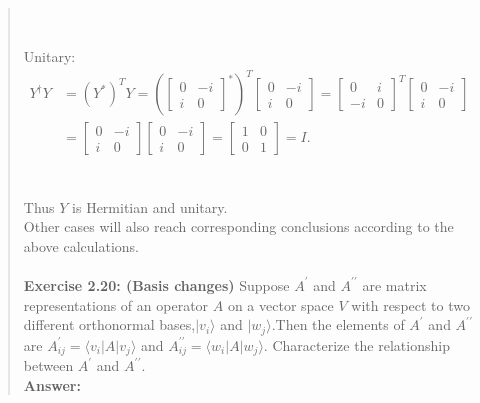 \documentclass[UTF8]{ctexart}
\begin{document}
\begin{quote}
	\\ \\
	 Unitary:\\
	$\begin{aligned} Y^{\dagger} Y &=\left(Y^{*}\right)^{T} Y=\left(\left[\begin{array}{cc}{0} & {-i} \\ {i} & {0}\end{array}	\right]^{*}\right)^{T}\left[\begin{array}{cc}{0} & {-i} \\ {i} & {0}\end{array}\right]=\left[\begin{array}{cc}{0} & {i} \\ {-i} & {0}\end{array}\right]^{T}\left[\begin{array}{cc}{0} & {-i} \\ {i} & {0}\end{array}\right] \\ &=\left[\begin{array}{cc}{0} & {-i} \\ {i} & 	{0}\end{array}\right]\left[\begin{array}{cc}{0} & {-i} \\ {i} & {0}\end{array}\right]=\left[\begin{array}{cc}{1} & {0} \\ {0} & 	{1}\end{array}\right]=I. \end{aligned}$\\ 
	\\ \\
	Thus $ Y$ is Hermitian and unitary. 
	\\
	Other cases will also reach corresponding conclusions according to the above calculations. 
	\\ \\
\textbf{Exercise 2.20: (Basis changes)} Suppose $A^{\prime}$ and  $A^{\prime\prime}$ are matrix representations of an
operator $A$ on a vector space $V$ with respect to two different orthonormal bases,$| v_{i}\rangle$ and $| w_{j}\rangle$.Then the elements of $A^{\prime}$  and $A^{\prime\prime}$ are $A_{i j}^{\prime}=\langle v_{i}|A| v_{j}\rangle$ and $A_{i j}^{\prime \prime}=\langle w_{i}|A| w_{j}\rangle$. Characterize the relationship between $A^{\prime}$ and  $A^{\prime\prime}$. \\
\textbf{Answer:}\\

\end{quote}
\end{document}
